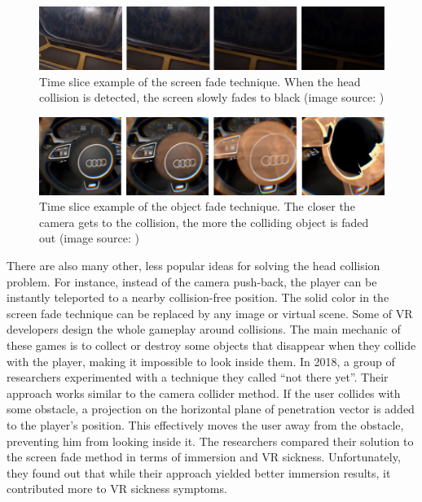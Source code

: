 \begin{figure}[th]
\centering
\includegraphics[width=1\textwidth]{img/screen_fade.png}
\caption{Time slice example of the screen fade technique. When the head collision is detected, the screen slowly fades to black (image source: \cite{SCREENFADE})}
\label{fig:SCREENFADEIMAGE}
\end{figure}

\begin{figure}[th]
\centering
\includegraphics[width=1\textwidth]{img/object_fade.png}
\caption{Time slice example of the object fade technique. The closer the camera gets to the collision, the more the colliding object is faded out (image source: \cite{OBJECTFADE})}
\label{fig:OBJECTFADEIMAGE}
\end{figure}

There are also many other, less popular ideas for solving the head collision problem. For instance, instead of the camera push-back, the player can be instantly teleported to a nearby collision-free position. The solid color in the screen fade technique can be replaced by any image or virtual scene. Some of VR developers design the whole gameplay around collisions. The main mechanic of these games is to collect or destroy some objects that disappear when they collide with the player, making it impossible to look inside them. In 2018, a group of researchers \cite{COMPARISONCOLLISION} experimented with a technique they called ``not there yet''. Their approach works similar to the camera collider method. If the user collides with some obstacle, a projection on the horizontal plane of penetration vector is added to the player's position. This effectively moves the user away from the obstacle, preventing him from looking inside it. The researchers compared their solution to the screen fade method in terms of immersion and VR sickness. Unfortunately, they found out that while their approach yielded better immersion results, it contributed more to VR sickness symptoms.

